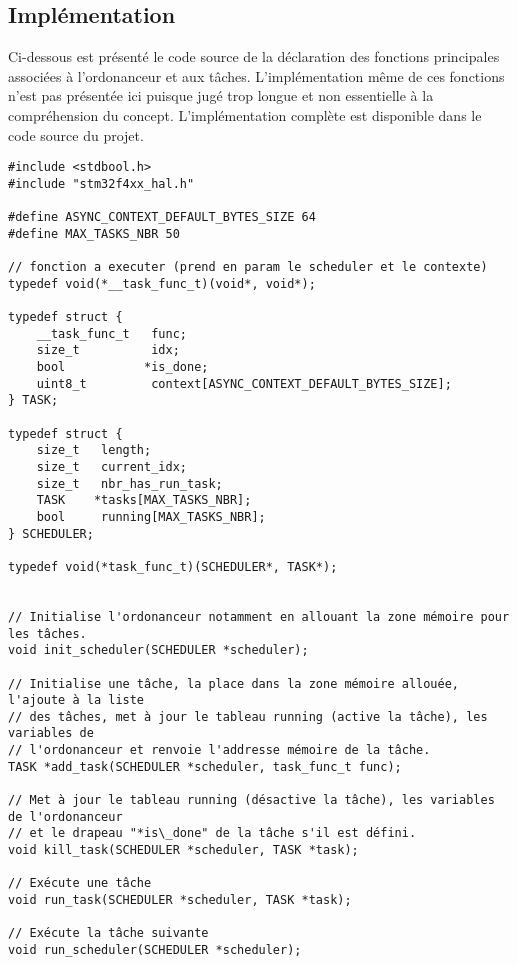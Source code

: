 \subsection{Implémentation}
\label{subsec:implementation}

Ci-dessous est présenté le code source de la déclaration des fonctions principales associées à l'ordonanceur
et aux tâches. L'implémentation même de ces fonctions n'est pas présentée ici puisque jugé trop longue et
non essentielle à la compréhension du concept. L'implémentation complète est disponible dans le code source
du projet.

\begin{lstlisting}[style=prog, frame=shadowbox, caption={Définition des tâches et de l'ordonanceur (scheduler.h)}, label={lst:async_h},
    emph={[1]ASYNC_CONTEXT_DEFAULT_BYTES_SIZE, MAX_TASKS_NBR, init_scheduler, add_task, kill_task, run_task,
    run_scheduler}, emphstyle={[1]\color{C}},
    emph={[2]SCHEDULER, TASK, __task_func_t, task_func_t}, emphstyle={[2]\color{E}}]
#include <stdbool.h>
#include "stm32f4xx_hal.h"

#define ASYNC_CONTEXT_DEFAULT_BYTES_SIZE 64
#define MAX_TASKS_NBR 50

// fonction a executer (prend en param le scheduler et le contexte)
typedef void(*__task_func_t)(void*, void*);

typedef struct {
    __task_func_t   func;
    size_t          idx;
    bool           *is_done;
    uint8_t         context[ASYNC_CONTEXT_DEFAULT_BYTES_SIZE];
} TASK;

typedef struct {
    size_t   length;
    size_t   current_idx;
    size_t   nbr_has_run_task;
    TASK    *tasks[MAX_TASKS_NBR];
    bool     running[MAX_TASKS_NBR];
} SCHEDULER;

typedef void(*task_func_t)(SCHEDULER*, TASK*);


// Initialise l'ordonanceur notamment en allouant la zone mémoire pour les tâches.
void init_scheduler(SCHEDULER *scheduler);

// Initialise une tâche, la place dans la zone mémoire allouée, l'ajoute à la liste
// des tâches, met à jour le tableau running (active la tâche), les variables de
// l'ordonanceur et renvoie l'addresse mémoire de la tâche.
TASK *add_task(SCHEDULER *scheduler, task_func_t func);

// Met à jour le tableau running (désactive la tâche), les variables de l'ordonanceur
// et le drapeau "*is\_done" de la tâche s'il est défini.
void kill_task(SCHEDULER *scheduler, TASK *task);

// Exécute une tâche
void run_task(SCHEDULER *scheduler, TASK *task);

// Exécute la tâche suivante
void run_scheduler(SCHEDULER *scheduler);
\end{lstlisting}